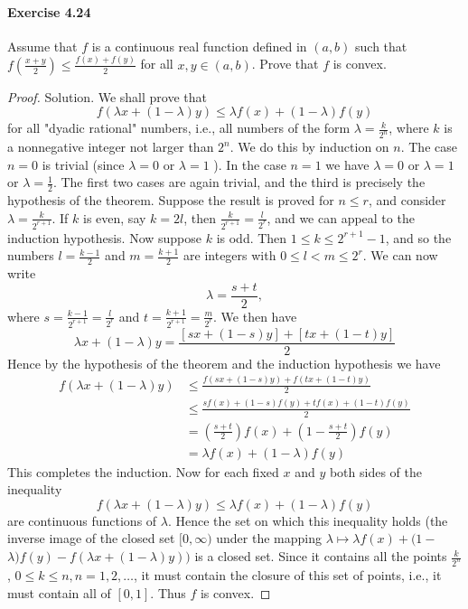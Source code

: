 \documentclass{article}
\theoremstyle{definition}
\begin{document}
\paragraph{Exercise 4.24} Assume that $f$ is a continuous real function defined in $(a, b)$ such that $f\left(\frac{x+y}{2}\right) \leq \frac{f(x)+f(y)}{2}$ for all $x, y \in(a, b)$. Prove that $f$ is convex.
\begin{proof}
    Solution. We shall prove that
$$
f(\lambda x+(1-\lambda) y) \leq \lambda f(x)+(1-\lambda) f(y)
$$
for all "dyadic rational" numbers, i.e., all numbers of the form $\lambda=\frac{k}{2^n}$, where $k$ is a nonnegative integer not larger than $2^n$. We do this by induction on $n$. The case $n=0$ is trivial (since $\lambda=0$ or $\lambda=1$ ). In the case $n=1$ we have $\lambda=0$ or $\lambda=1$ or $\lambda=\frac{1}{2}$. The first two cases are again trivial, and the third is precisely the hypothesis of the theorem. Suppose the result is proved for $n \leq r$, and consider $\lambda=\frac{k}{2^{r+1}}$. If $k$ is even, say $k=2 l$, then $\frac{k}{2^{r+1}}=\frac{l}{2^r}$, and we can appeal to the induction hypothesis. Now suppose $k$ is odd. Then $1 \leq k \leq 2^{r+1}-1$, and so the numbers $l=\frac{k-1}{2}$ and $m=\frac{k+1}{2}$ are integers with $0 \leq l<m \leq 2^r$. We can now write
$$
\lambda=\frac{s+t}{2},
$$
where $s=\frac{k-1}{2^{r+1}}=\frac{l}{2^r}$ and $t=\frac{k+1}{2^{r+1}}=\frac{m}{2^r}$. We then have
$$
\lambda x+(1-\lambda) y=\frac{[s x+(1-s) y]+[t x+(1-t) y]}{2}
$$
Hence by the hypothesis of the theorem and the induction hypothesis we have
$$
\begin{aligned}
f(\lambda x+(1-\lambda) y) & \leq \frac{f(s x+(1-s) y)+f(t x+(1-t) y)}{2} \\
& \leq \frac{s f(x)+(1-s) f(y)+t f(x)+(1-t) f(y)}{2} \\
&=\left(\frac{s+t}{2}\right) f(x)+\left(1-\frac{s+t}{2}\right) f(y) \\
&=\lambda f(x)+(1-\lambda) f(y)
\end{aligned}
$$
This completes the induction.
Now for each fixed $x$ and $y$ both sides of the inequality
$$
f(\lambda x+(1-\lambda) y) \leq \lambda f(x)+(1-\lambda) f(y)
$$
are continuous functions of $\lambda$. Hence the set on which this inequality holds (the inverse image of the closed set $[0, \infty)$ under the mapping $\lambda \mapsto \lambda f(x)+(1-$ $\lambda) f(y)-f(\lambda x+(1-\lambda) y))$ is a closed set. Since it contains all the points $\frac{k}{2^n}$, $0 \leq k \leq n, n=1,2, \ldots$, it must contain the closure of this set of points, i.e., it must contain all of $[0,1]$. Thus $f$ is convex.
\end{proof}
\end{document}
